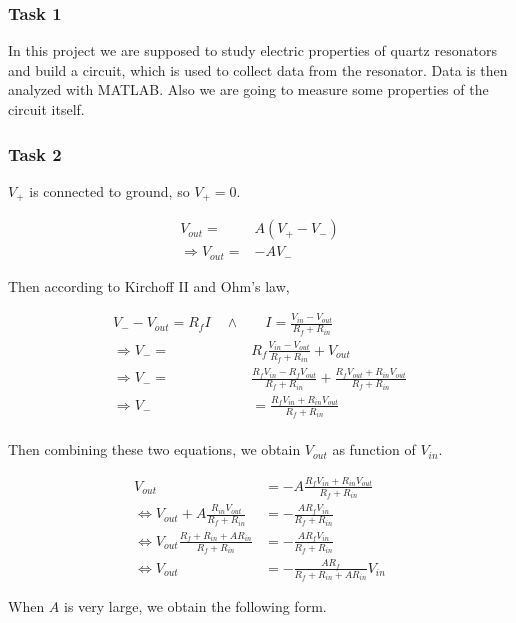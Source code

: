 \documentclass[12pt]{article}
\begin{document}
\subsubsection{Task 1}

In this project we are supposed to study electric properties of quartz resonators and build a circuit, which is used to collect data from the resonator. Data is then analyzed with MATLAB. Also we are going to measure some properties of the circuit itself.

\subsubsection{Task 2}

$V_+$ is connected to ground, so $V_+ = 0$.

\begin{align*}
V_{out} =& A(V_+ - V_-) \\
\Rightarrow V_{out} =& -AV_-
\end{align*}

Then according to Kirchoff II and Ohm's law,

\begin{align*}
V_- - V_{out} = R_f I \quad \wedge & \quad I = \frac{V_{in} - V_{out}}{R_f + R_{in}} \\
\Rightarrow V_- =& R_f \frac{V_{in} - V_{out}}{R_f + R_{in}} + V_{out} \\
\Rightarrow V_- =& \frac{R_f V_{in} - R_f V_{out}}{R_f + R_{in}} + \frac{R_f V_{out} + R_{in} V_{out}}{R_f + R_{in}} \\
\Rightarrow V_- &= \frac{R_f V_{in} + R_{in} V_{out}}{R_f + R_{in}} \\
\end{align*}

Then combining these two equations, we obtain $V_{out}$ as function of $V_{in}$.

\begin{align*}
V_{out} &= -A\frac{R_f V_{in} + R_{in} V_{out}}{R_f + R_{in}} \\
\Leftrightarrow V_{out} + A\frac{R_{in} V_{out}}{R_f + R_{in}} &= -\frac{A R_f V_{in}}{R_f + R_{in}} \\
\Leftrightarrow V_{out}\frac{R_f + R_{in} + A R_{in}}{R_f + R_{in}} &= -\frac{A R_f V_{in}}{R_f + R_{in}} \\
\Leftrightarrow V_{out} &= -\frac{A R_f}{R_f + R_{in} + A R_{in}} V_{in}
\end{align*}

When $A$ is very large, we obtain the following form.
\end{document}
